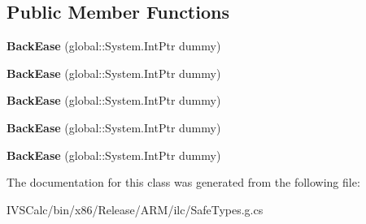 \subsection*{Public Member Functions}
\begin{DoxyCompactItemize}
\item 
\mbox{\label{class_windows_1_1_u_i_1_1_xaml_1_1_media_1_1_animation_1_1_back_ease_a9cbeb4f5a41429a1e06abd2f230886bc}} 
{\bfseries Back\+Ease} (global\+::\+System.\+Int\+Ptr dummy)
\item 
\mbox{\label{class_windows_1_1_u_i_1_1_xaml_1_1_media_1_1_animation_1_1_back_ease_a9cbeb4f5a41429a1e06abd2f230886bc}} 
{\bfseries Back\+Ease} (global\+::\+System.\+Int\+Ptr dummy)
\item 
\mbox{\label{class_windows_1_1_u_i_1_1_xaml_1_1_media_1_1_animation_1_1_back_ease_a9cbeb4f5a41429a1e06abd2f230886bc}} 
{\bfseries Back\+Ease} (global\+::\+System.\+Int\+Ptr dummy)
\item 
\mbox{\label{class_windows_1_1_u_i_1_1_xaml_1_1_media_1_1_animation_1_1_back_ease_a9cbeb4f5a41429a1e06abd2f230886bc}} 
{\bfseries Back\+Ease} (global\+::\+System.\+Int\+Ptr dummy)
\item 
\mbox{\label{class_windows_1_1_u_i_1_1_xaml_1_1_media_1_1_animation_1_1_back_ease_a9cbeb4f5a41429a1e06abd2f230886bc}} 
{\bfseries Back\+Ease} (global\+::\+System.\+Int\+Ptr dummy)
\end{DoxyCompactItemize}


The documentation for this class was generated from the following file\+:\begin{DoxyCompactItemize}
\item 
I\+V\+S\+Calc/bin/x86/\+Release/\+A\+R\+M/ilc/Safe\+Types.\+g.\+cs\end{DoxyCompactItemize}
